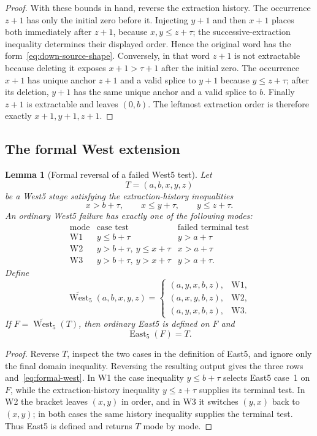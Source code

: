 \documentclass[11pt]{article}
\newtheorem{lemma}[theorem]{Lemma}
\theoremstyle{definition}
\theoremstyle{remark}
\newcommand{\East}{\operatorname{East}}
\newcommand{\West}{\operatorname{West}}
\begin{document}
\begin{proof}
With these bounds in hand, reverse the extraction history.  The occurrence
$z+1$ has only the initial zero before it.  Injecting $y+1$ and then $x+1$
places both immediately after $z+1$, because $x,y\le z+\tau$; the
successive-extraction inequality determines their displayed order.  Hence
the original word has the form~\eqref{eq:down-source-shape}.  Conversely,
in that word $z+1$ is not extractable because deleting it exposes
$x+1>\tau+1$ after the initial zero.  The occurrence $x+1$ has unique anchor
$z+1$ and a valid splice to $y+1$ because $y\le z+\tau$; after its deletion,
$y+1$ has the same unique anchor and a valid splice to $b$.  Finally
$z+1$ is extractable and leaves $(0,b)$.  The leftmost extraction order is
therefore exactly $x+1,y+1,z+1$.
\end{proof}

\subsection{The formal West extension}

\begin{lemma}[Formal reversal of a failed West5 test]
\label{lem:formal-west}
Let
\[
 T=(a,b,x,y,z)
\]
be a West5 stage satisfying the extraction-history inequalities
\[
 x>b+\tau,
 \qquad x\le y+\tau,
 \qquad y\le z+\tau.
\]
An ordinary West5 failure has exactly one of the following modes:
\[
\begin{array}{c|c|c}
\text{mode}&\text{case test}&\text{failed terminal test}\\ \hline
\mathrm{W1}&y\le b+\tau&y>a+\tau\\
\mathrm{W2}&y>b+\tau,\ y\le x+\tau&x>a+\tau\\
\mathrm{W3}&y>b+\tau,\ y>x+\tau&y>a+\tau.
\end{array}
\]
Define
\begin{equation}
 \widetilde{\West}_5(a,b,x,y,z)=
 \begin{cases}
  (a,y,x,b,z),&\mathrm{W1},\\
  (a,x,y,b,z),&\mathrm{W2},\\
  (a,y,x,b,z),&\mathrm{W3}.
 \end{cases}
 \label{eq:formal-west}
\end{equation}
If $F=\widetilde{\West}_5(T)$, then ordinary East5 is defined on $F$ and
\[
 \East_5(F)=T.
\]
\end{lemma}

\begin{proof}
Reverse $T$, inspect the two cases in the definition of East5, and ignore
only the final domain inequality.  Reversing the resulting output gives the
three rows and~\eqref{eq:formal-west}.  In W1 the case inequality
$y\le b+\tau$ selects East5 case~1 on $F$, while the extraction-history
inequality $y\le z+\tau$ supplies its terminal test.  In W2 the bracket
leaves $(x,y)$ in order, and in W3 it switches $(y,x)$ back to $(x,y)$;
in both cases the same history inequality supplies the terminal test.
Thus East5 is defined and returns $T$ mode by mode.
\end{proof}
\end{document}
